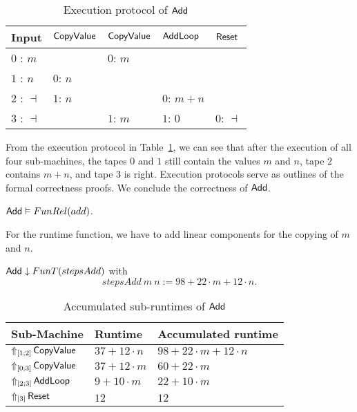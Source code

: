 \begin{table}[h]
  \centering
  \begin{tabular}{l||l|l|l|l}
    Input          & $\MS{CopyValue}$ & $\MS{CopyValue}$ & $\MS{AddLoop}$ & $\MS{Reset}$ \\ \hline
    $0$ : $m$      &                  & $0$: $m$         &                &              \\
    $1$ : $n$      & $0$: $n$         &                  &                &              \\
    $2$ : $\dashv$ & $1$: $n$         &                  & $0$: $m+n$     &              \\
    $3$ : $\dashv$ &                  & $1$: $m$         & $1$: $0$       & $0$: $\dashv$\\
  \end{tabular}
  \caption{Execution protocol of $\MS{Add}$}
  \label{tab:exec-Add}
\end{table}

From the execution protocol in Table~\ref{tab:exec-Add}, we can see that after the execution of all four sub-machines, the tapes $0$ and $1$ still
contain the values $m$ and $n$, tape $2$ contains $m+n$, and tape $3$ is right.  Execution protocols serve as outlines of the formal correctness
proofs.  We conclude the correctness of $\MS{Add}$.
\begin{lemma}
  \label{lem:Add_Computes}
  $\MS{Add} \Realise FunRel(add)$.
\end{lemma}

For the runtime function, we have to add linear components for the copying of $m$ and $n$.
\begin{lemma}
  $\MS{Add} \downarrow FunT(stepsAdd)$ with
  \[
    stepsAdd~m~n := 98 + 22 \cdot m + 12 \cdot n.
  \]
\end{lemma}

\begin{table}[h]
  \centering
  \begin{tabular}{|l|l|l|}
    \hline Sub-Machine & Runtime & Accumulated runtime \\ \hline\hline
    $\LiftTapes{\MS{CopyValue}}{\Vector{1;2}}$  & $37 + 12 \cdot n$ & $98 + 22 \cdot m + 12 \cdot n$ \\ \hline
    $\LiftTapes{\MS{CopyValue}}{\Vector{0;3}}$  & $37 + 12 \cdot m$ & $60 + 22 \cdot m$ \\ \hline
    $\LiftTapes{\MS{AddLoop}}{\Vector{2;3}}$    & $9 + 10 \cdot m$  & $22 + 10 \cdot m$ \\ \hline
    $\LiftTapes{\MS{Reset}}{\Vector{3}}$        & $12$              & $12$ \\ \hline
  \end{tabular}
  \caption{Accumulated sub-runtimes of $\MS{Add}$}
  \label{tab:runtime-Add}
\end{table}

